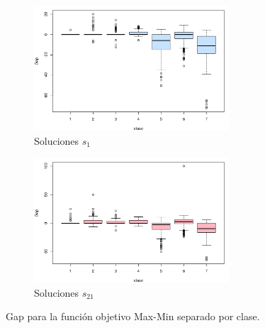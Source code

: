 \documentclass[preprint,12pt,authoryear]{elsarticle}
\begin{document}
\begin{figure}
	\centering
	\begin{subfigure}{\textwidth}
		\centering
		\includegraphics[width=0.8\textwidth]{box_gap1.png}
		\caption{Soluciones $s_1$}
	\end{subfigure}
	\begin{subfigure}{\textwidth}
		\centering
		\includegraphics[width=0.8\textwidth]{box_gap21.png}
		\caption{Soluciones $s_{21}$}
	\end{subfigure}
	\caption{Gap para la función objetivo Max-Min separado por clase.}
	\label{boxob1}
\end{figure}
\end{document}
